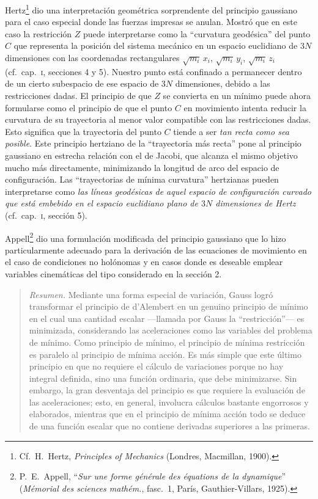 \documentclass[12pt,a4paper]{book}
\begin{document}
Hertz\footnote{Cf.\ H.\ Hertz, \textit{Principles of Mechanics} (Londres, Macmillan, 1900).} dio una interpretación geométrica sorprendente del principio gaussiano para el caso especial donde las fuerzas impresas se anulan. Mostró que en este caso la restricción $Z$ puede interpretarse como la ``curvatura geodésica'' del punto $C$ que representa la posición del sistema mecánico en un espacio euclidiano de $3N$ dimensiones con las coordenadas rectangulares $\sqrt{m_i}\,x_i$, $\sqrt{m_i}\,y_i$, $\sqrt{m_i}\,z_i$ (cf.\ cap.\ \textsc{i}, secciones 4 y 5). Nuestro punto está confinado a permanecer dentro de un cierto subespacio de ese espacio de $3N$ dimensiones, debido a las restricciones dadas. El principio de que $Z$ se convierta en un mínimo puede ahora formularse como el principio de que el punto $C$ en movimiento intenta reducir la curvatura de su trayectoria al menor valor compatible con las restricciones dadas. Esto significa que la trayectoria del punto $C$ tiende a ser \textit{tan recta como sea posible}. Este principio hertziano de la ``trayectoria más recta'' pone al principio gaussiano en estrecha relación con el de Jacobi, que alcanza el mismo objetivo mucho más directamente, minimizando la longitud de arco del espacio de configuración. Las ``trayectorias de mínima curvatura'' hertzianas pueden interpretarse como \textit{las líneas geodésicas de aquel espacio de configuración curvado que está embebido en el espacio euclidiano plano de $3N$ dimensiones de Hertz} (cf.\ cap.\ \textsc{i}, sección 5).

Appell\footnote{P.\ E.\ Appell, ``\textit{Sur une forme g\'en\'erale des \'equations de la dynamique}'' (\textit{M\'emorial des sciences math\'em.}, fasc.\ 1, París, Gauthier-Villars, 1925).} dio una formulación modificada del principio gaussiano que lo hizo particularmente adecuado para la derivación de las ecuaciones de movimiento en el caso de condiciones no holónomas y en casos donde es deseable emplear variables cinemáticas del tipo considerado en la sección 2.

\begin{quote}
\textit{Resumen.} Mediante una forma especial de variación, Gauss logró transformar el principio de d'Alembert en un genuino principio de mínimo en el cual una cantidad escalar ---llamada por Gauss la ``restricción''--- es minimizada, considerando las aceleraciones como las variables del problema de mínimo. Como principio de mínimo, el principio de mínima restricción es paralelo al principio de mínima acción. Es más simple que este último principio en que no requiere el cálculo de variaciones porque no hay integral definida, sino una función ordinaria, que debe minimizarse. Sin embargo, la gran desventaja del principio es que requiere la evaluación de las aceleraciones; esto, en general, involucra cálculos bastante engorrosos y elaborados, mientras que en el principio de mínima acción todo se deduce de una función escalar que no contiene derivadas superiores a las primeras.
\end{quote}
\end{document}
